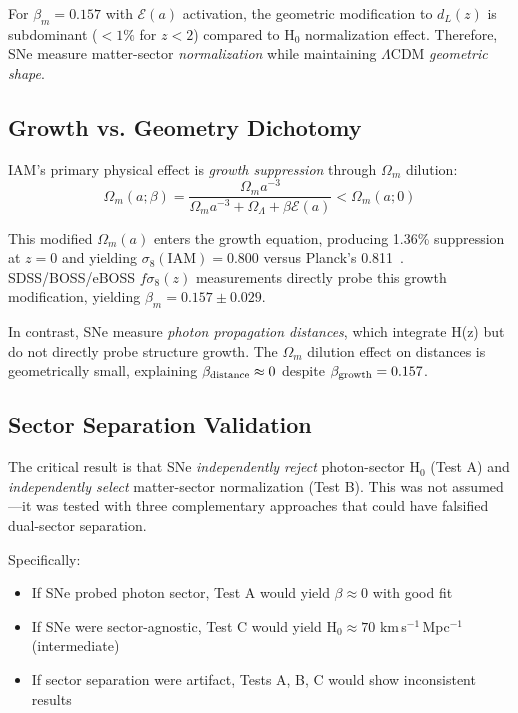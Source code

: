 \documentclass[twocolumn,superscriptaddress,prd,amsmath,amssymb]{revtex4-2}
\begin{document}
For $\beta_m = 0.157$ with $\mathcal{E}(a)$ activation, the geometric modification to $d_L(z)$ is subdominant ($<1\%$ for $z < 2$) compared to H$_0$ normalization effect. Therefore, SNe measure matter-sector \textit{normalization} while maintaining $\Lambda$CDM \textit{geometric shape}.

\subsection{Growth vs. Geometry Dichotomy}

IAM's primary physical effect is \textit{growth suppression} through $\Omega_m$ dilution:
\begin{equation}
\Omega_m(a;\beta) = \frac{\Omega_m a^{-3}}{\Omega_m a^{-3} + \Omega_\Lambda + \beta\mathcal{E}(a)} < \Omega_m(a;0)
\end{equation}

This modified $\Omega_m(a)$ enters the growth equation, producing 1.36\% suppression at $z=0$ and yielding $\sigma_8(\text{IAM}) = 0.800$ versus Planck's 0.811~\cite{IAMCompendium2025}. SDSS/BOSS/eBOSS $f\sigma_8(z)$ measurements directly probe this growth modification, yielding $\beta_m = 0.157 \pm 0.029$.

In contrast, SNe measure \textit{photon propagation distances}, which integrate H(z) but do not directly probe structure growth. The $\Omega_m$ dilution effect on distances is geometrically small, explaining $\beta_{\rm distance} \approx 0$ despite $\beta_{\rm growth} = 0.157$.

\subsection{Sector Separation Validation}

The critical result is that SNe \textit{independently reject} photon-sector H$_0$ (Test A) and \textit{independently select} matter-sector normalization (Test B). This was not assumed---it was tested with three complementary approaches that could have falsified dual-sector separation.

Specifically:
\begin{itemize}
\item If SNe probed photon sector, Test A would yield $\beta \approx 0$ with good fit
\item If SNe were sector-agnostic, Test C would yield H$_0 \approx 70$ km\,s$^{-1}$\,Mpc$^{-1}$ (intermediate)
\item If sector separation were artifact, Tests A, B, C would show inconsistent results
\end{itemize}
\end{document}
